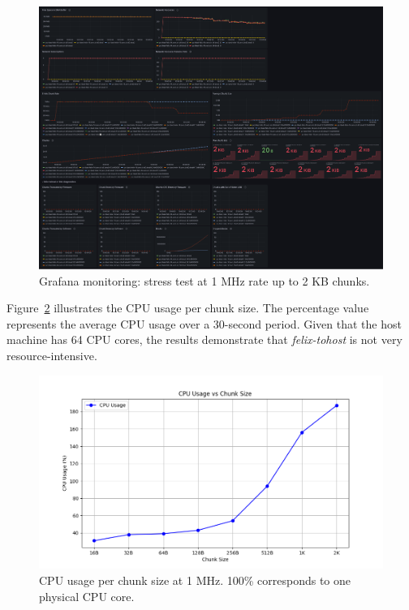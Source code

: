 \begin{figure}[htbp]
\centering
\includegraphics[width=\textwidth]{images/results/tohost-perf.png}
\caption{Grafana monitoring: stress test at 1 MHz rate up to 2 KB chunks.}
\label{fig:tohost-perf}
\end{figure}

Figure~\ref{fig:cpu-usage} illustrates the CPU usage per chunk size. The percentage value represents the average CPU usage over a 30-second period. Given that the host machine has 64 CPU cores, the results demonstrate that \emph{felix-tohost} is not very resource-intensive.

\begin{figure}[htbp]
\centering
\includegraphics[width=\textwidth]{images/results/cpu-usage-chunk-size-1MHz.png}
\caption[CPU usage per chunk size at 1 MHz]{CPU usage per chunk size at 1 MHz. 100\% corresponds to one physical CPU core.}
\label{fig:cpu-usage}
\end{figure}

